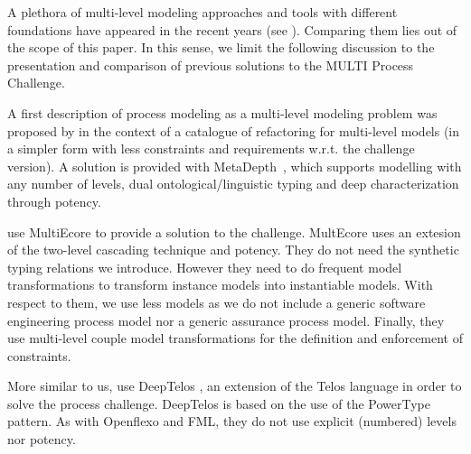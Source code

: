 
A plethora of multi-level modeling approaches and tools with different foundations have appeared in the recent years (see \cite{multiTools}). Comparing them lies out of the scope of this paper. In this sense, we limit the following discussion to the presentation and comparison of previous solutions to the MULTI Process Challenge.

A first description of process modeling as a multi-level modeling problem was proposed by \cite{lara2018refactoring} in the context of a catalogue of refactoring for multi-level models (in a simpler form with less constraints and requirements w.r.t. the challenge version). A solution is provided with MetaDepth~\citep{metadepth}, which supports modelling with any number of levels, dual ontological/linguistic typing and deep characterization through potency.

\cite{multiecore2019} use MultiEcore \citep{multecore2016} to provide a solution to the challenge. MultEcore uses an extesion of the two-level cascading technique and potency. They do not need the synthetic typing relations we introduce. However they need to do frequent model transformations to transform instance models into instantiable models. With respect to them, we use less models as we do not include a generic software engineering process model nor a generic assurance process model. Finally, they use multi-level couple model transformations for the definition and enforcement of constraints.

More similar to us, \cite{deeptelos2019} use DeepTelos \citep{deeptelos2016}, an extension of the Telos language \citep{telos1990} in order to solve the process challenge. DeepTelos is based on the use of the PowerType \citep{atkinson2001essence} pattern. As with Openflexo and FML, they do not use explicit (numbered) levels nor potency.




